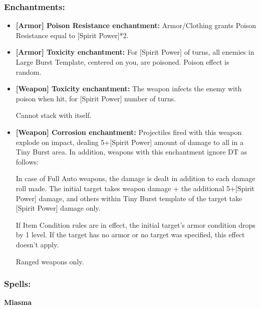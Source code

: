 \documentclass[11pt,a4paper,twocolumn]{book}
\begin{document}
\subsubsection*{Enchantments:}
\begin{itemize}
\item \textbf{ [Armor] Poison Resistance enchantment:} Armor/Clothing grants Poison Resistance equal to [Spirit Power]*2.
	\item \textbf{ [Armor] Toxicity enchantment:} For [Spirit Power] of turns, all enemies in Large Burst Template, centered on you, are poisoned. Poison effect is random.

	\item \textbf{ [Weapon] Toxicity enchantment:} The weapon infects the enemy with poison when hit, for [Spirit Power] number of turns.
    
    Cannot stack with itself.

	\item \textbf{ [Weapon] Corrosion enchantment:} Projectiles fired with this weapon explode on impact, dealing 5+[Spirit Power] amount of damage to all in a Tiny Burst area. In addition, weapons with this enchantment ignore DT as follows:
   
   In case of Full Auto weapons, the damage is dealt in addition to each damage roll made. The initial target takes weapon damage + the additional 5+[Spirit Power] damage, and others within Tiny Burst template of the target take [Spirit Power] damage only.
   
   If Item Condition rules are in effect, the initial target's armor condition drops by 1 level. If the target has no armor or no target was specified, this effect doesn't apply. 
 
Ranged weapons only.    

\end{itemize}

\subsubsection*{Spells:}

\smallskip
\noindent
\textbf{Miasma}
\end{document}

